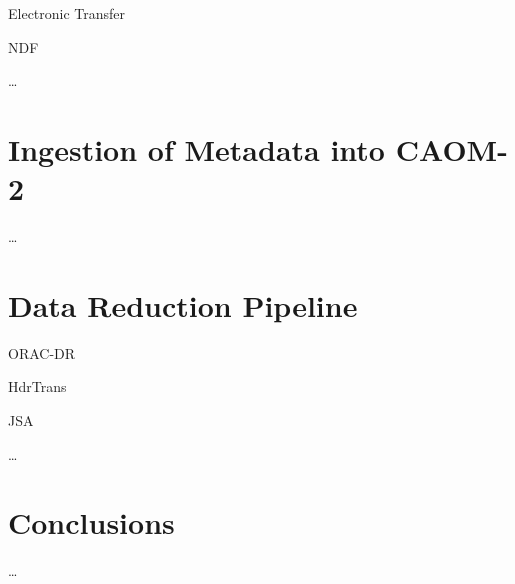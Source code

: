 \documentclass[11pt,twoside]{article}
\begin{document}
Electronic Transfer \citep{2005ASPC..347..647M}

NDF \citep{P91_adassxxiii}

\ldots

\section{Ingestion of Metadata into CAOM-2}

\ldots

\section{Data Reduction Pipeline}

ORAC-DR \citep{1999ASPC..172...11E,2008AN....329..295C}

HdrTrans \citep[section 2.2]{2008AN....329..295C}

JSA \citep{2011ASPC..442..203E}

\ldots

\section{Conclusions}

\ldots


\end{document}
